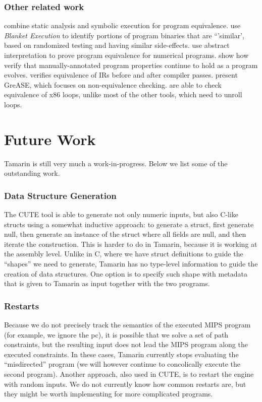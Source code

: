 \documentclass{llncs}
\begin{document}
\subsubsection{Other related work}

\cite{person2011directed} combine static analysis and symbolic execution for program equivalence. \cite{egele2014blanket} use \emph{Blanket Execution} to identify portions of program binaries that are ``'similar', based on randomized testing and having similar side-effects. \cite{partush2013abstract} use abstract interpretation to prove program equivalence for numerical programs. \cite{yang2014property} show how verify that manually-annotated program properties continue to hold as a program evolves. \cite{necula2000translation} verifies equivalence of IRs before and after compiler passes. \cite{francesco2014grease} present GreASE, which focuses on non-equivalence checking. \cite{sharma2013data} are able to check equivalence of x86 loops, unlike most of the other tools, which need to unroll loops.

\section{Future Work}

Tamarin is still very much a work-in-progress. Below we list some of the outstanding work.

\subsubsection{Data Structure Generation} The CUTE tool \cite{sen2005cute} is able to generate not only numeric inputs, but also C-like \textsf{structs} using a somewhat inductive approach: to generate a \textsf{struct}, first generate \textsf{null}, then generate an instance of the \textsf{struct} where all fields are \textsf{null}, and then iterate the construction. This is harder to do in Tamarin, because it is working at the assembly level. Unlike in C, where we have \textsf{struct} definitions to guide the ``shapes'' we need to generate, Tamarin has no type-level information to guide the creation of data structures. One option is to specify such shape with metadata that is given to Tamarin as input together with the two programs.

\subsubsection{Restarts} Because we do not precisely track the semantics of the executed MIPS program (for example, we ignore the \textsf{pc}), it is possible that we solve a set of path constraints, but the resulting input does not lead the MIPS program along the executed constraints. In these cases, Tamarin currently stops evaluating the ``misdirected'' program (we will however continue to concolically execute the second program). Another approach, also used in CUTE, is to restart the engine with random inputs. We do not currently know how common restarts are, but they might be worth implementing for more complicated programs.
\end{document}
